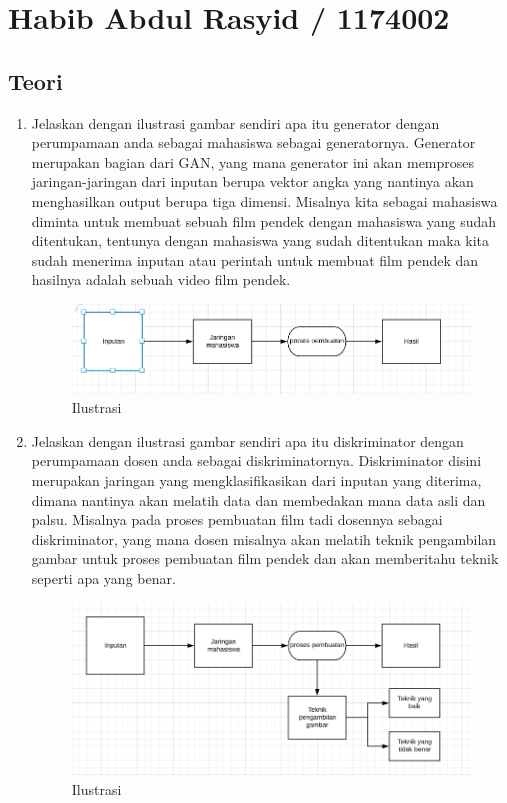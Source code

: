 \section{Habib Abdul Rasyid / 1174002}
\subsection{Teori}

\begin{enumerate}

\item Jelaskan dengan ilustrasi gambar sendiri apa itu generator dengan perumpamaan anda sebagai mahasiswa sebagai generatornya.
Generator merupakan bagian dari GAN, yang mana generator ini akan memproses jaringan-jaringan dari inputan berupa vektor angka yang nantinya akan menghasilkan output berupa tiga dimensi. Misalnya kita sebagai mahasiswa diminta untuk membuat sebuah film pendek dengan mahasiswa yang sudah ditentukan, tentunya dengan mahasiswa yang sudah ditentukan maka kita sudah menerima inputan atau perintah untuk membuat film pendek dan hasilnya adalah sebuah video film pendek.
\begin{figure}[ht]
\centering
\includegraphics[scale=0.3]{figures/1174002/chapter8/1.PNG}
\caption{Ilustrasi}
\label{Contoh}
\end{figure}


\item Jelaskan dengan ilustrasi gambar sendiri apa itu diskriminator dengan perumpamaan dosen anda sebagai diskriminatornya.
Diskriminator disini merupakan jaringan yang mengklasifikasikan dari inputan yang diterima, dimana nantinya akan melatih data dan membedakan mana data asli dan palsu. Misalnya pada proses pembuatan film tadi dosennya sebagai diskriminator, yang mana dosen misalnya akan melatih teknik pengambilan gambar untuk proses pembuatan film pendek dan akan memberitahu teknik seperti apa yang benar.
\begin{figure}[ht]
\centering
\includegraphics[scale=0.3]{figures/1174002/chapter8/2.PNG}
\caption{Ilustrasi}
\label{Contoh}
\end{figure}



\end{enumerate}

